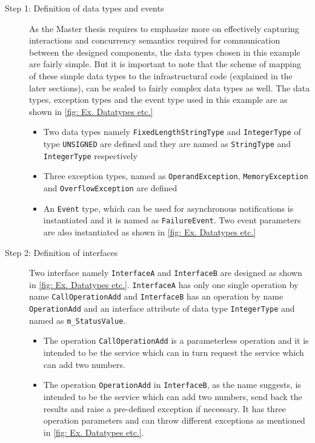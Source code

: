 \begin{description}
\item [Step 1: Definition of data types and events] As the Master thesis requires to emphasize more on effectively capturing interactions and concurrency semantics required for communication between the designed components, the data types chosen in this example are fairly simple. But it is important to note that the scheme of mapping of these simple data types to the infrastructural code (explained in the later sections), can be scaled to fairly complex data types as well. The data types, exception types and the event type used in this example are as shown in \cref{fig: Ex. Datatypes etc.}  

\begin{itemize}
\item Two data types namely \texttt{Fixed\allowbreak Length\allowbreak String\allowbreak Type} and \texttt{Integer\allowbreak Type} of type \texttt{UNSIGNED} are defined and they are named as \texttt{StringType} and \texttt{IntegerType} respectively

\item Three exception types, named as \texttt{OperandException}, \texttt{MemoryException} and \texttt{Overflow\allowbreak Exception} are defined 

\item An \texttt{Event} type, which can be used for asynchronous notifications \cite{SpecMetamodel} is instantiated and it is named as \texttt{FailureEvent}. Two event parameters are also instantiated as shown in \cref{fig: Ex. Datatypes etc.}

\end{itemize} 

\item [Step 2: Definition of interfaces] Two interface namely \texttt{InterfaceA} and \texttt{InterfaceB} are designed as shown in \cref{fig: Ex. Datatypes etc.}. \texttt{InterfaceA} has only one single operation by name \texttt{CallOperationAdd} and \texttt{InterfaceB} has an operation by name \texttt{OperationAdd} and an interface attribute of data type \texttt{IntegerType} and named as \texttt{m\_StatusValue}.  

\begin{itemize}
\item The operation \texttt{CallOperationAdd} is a parameterless operation and it is intended to be the service which can in turn request the service which can add two numbers.

\item The operation \texttt{OperationAdd} in \texttt{InterfaceB}, as the name suggests, is intended to be the service which can add two numbers, send back the results and raise a pre-defined exception if necessary. It has three operation parameters and can throw different exceptions as mentioned in \cref{fig: Ex. Datatypes etc.}. 


\end{itemize}
\end{description}
